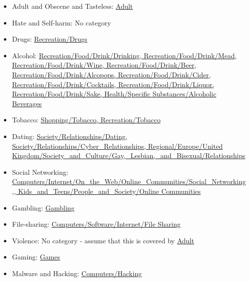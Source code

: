 \documentclass{bmcart}
\begin{document}
\begin{backmatter}
\begin{itemize}
	\item Adult and Obscene and Tasteless: \url{Adult}
	\item Hate and Self-harm: No category
	\item Drugs: \url{Recreation/Drugs}
	\item Alcohol: \url{Recreation/Food/Drink/Drinking, Recreation/Food/Drink/Mead, Recreation/Food/Drink/Wine, Recreation/Food/Drink/Beer, Recreation/Food/Drink/Alcopops, Recreation/Food/Drink/Cider, Recreation/Food/Drink/Cocktails, Recreation/Food/Drink/Liquor, Recreation/Food/Drink/Sake, Health/Specific Substances/Alcoholic Beverages}
	\item Tobacco: \url{Shopping/Tobacco, Recreation/Tobacco}
	\item Dating: \url{Society/Relationships/Dating, Society/Relationships/Cyber_Relationships, Regional/Europe/United Kingdom/Society_and_Culture/Gay,_Lesbian,_and_Bisexual/Relationships}
	\item Social Networking: \url{Computers/Internet/On_the_Web/Online_Communities/Social_Networking,, Kids_and_Teens/People_and_Society/Online Communities}
	\item Gambling: \url{Gambling}
	\item File-sharing: \url{Computers/Software/Internet/File Sharing}
	\item Violence: No category - assume that this is covered by \url{Adult}
	\item Gaming: \url{Games}
	\item Malware and Hacking: \url{Computers/Hacking}
\end{itemize}

\end{backmatter}
\end{document}
